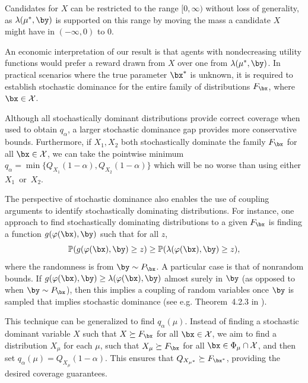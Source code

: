 \documentclass[11pt]{article}
\numberwithin{equation}{section}
\numberwithin{figure}{section}
\begin{document}
\begin{remark}
    Candidates for $X$ can be restricted to the range $[0, \infty)$ without loss of generality, as $\lambda(\mu^*, \by)$ is supported on this range by moving the mass a candidate $X$ might have in $(-\infty, 0)$ to $0$.
\end{remark}

An economic interpretation of our result is that agents with nondecreasing utility functions would prefer a reward drawn from $X$ over one from $\lambda(\mu^*, \by)$. 
In practical scenarios where the true parameter $\bx^*$ is unknown, it is required to establish stochastic dominance for the entire family of distributions $F_{\bx}$, where $\bx \in \mathcal X$.

Although all stochastically dominant distributions provide correct coverage when used to obtain $q_\alpha$, a larger stochastic dominance gap provides more conservative bounds. 
Furthermore, if $X_1, X_2$ both stochastically dominate the family $F_{\bx}$ for all $\bx \in \mathcal X$, we can take the pointwise minimum $q_\alpha = \min\{ Q_{X_1}(1-\alpha), Q_{X_2}(1-\alpha) \}$ which will be no worse than using either $X_1$~or~$X_2$.

The perspective of stochastic dominance also enables the use of coupling arguments to identify stochastically dominating distributions. 
For instance, one approach to find stochastically dominating distributions to a given $F_{\bx}$ is finding a function $g(\varphi(\bx), \by)$ such that for all $z$,
\begin{equation*}
\mathbb P(g(\varphi(\bx), \by) \geq z) \geq \mathbb {P}(\lambda(\varphi(\bx), \by) \geq z),
\end{equation*}
where the randomness is from $\by \sim P_{\bx}$.
A particular case is that of nonrandom bounds. 
If $g(\varphi(\bx), \by) \geq \lambda(\varphi(\bx), \by)$ almost surely in $\by$ (as opposed to when $\by \sim P_{\bx}$), then this implies a coupling of random variables once $\by$ is sampled that implies stochastic dominance (see e.g. Theorem~4.2.3 in \cite{ProbabilityBook}).

This technique can be generalized to find $q_\alpha(\mu)$. 
Instead of finding a stochastic dominant variable $X$ such that $X \succeq F_\bx$ for all $\bx \in \mathcal{X}$, we aim to find a distribution $X_\mu$ for each $\mu$, such that $X_\mu \succeq F_\bx$ for all $\bx \in \Phi_\mu \cap \mathcal{X}$, and then set $q_\alpha(\mu) = Q_{X_\mu}(1-\alpha)$. 
This ensures that $Q_{X_{\mu^*}} \succeq F_{\bx^*}$, providing the desired coverage guarantees.
\end{document}
